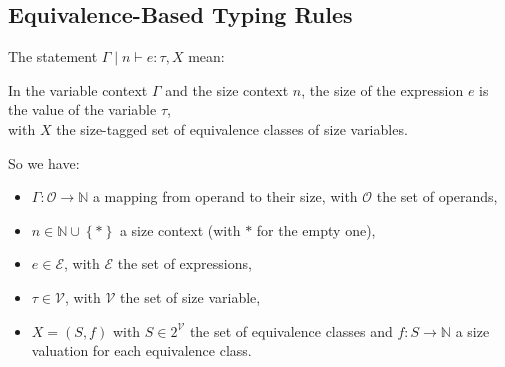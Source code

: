 \documentclass{article}
\begin{document}
\subsection*{Equivalence-Based Typing Rules}

The statement $\Gamma \mid n \vdash e: \tau, X$ mean:
\begin{center}
  In the variable context $\Gamma$ and the size context $n$, the size of the expression $e$ is the value of the variable $\tau$,\\
  with $X$ the size-tagged set of equivalence classes of size
  variables.
\end{center}

So we have:
\begin{itemize}
  \item $\Gamma: \mathcal{O} \to \mathbb{N}$ a mapping from operand to
        their size, with $\mathcal{O}$ the set of operands,
  \item $n \in \mathbb{N} \cup \left\{\ast\right\}$ a size context (with
        $\ast$ for the empty one),
  \item $e \in \mathcal{E}$, with $\mathcal{E}$ the set of expressions,
  \item $\tau \in \mathcal{V}$, with $\mathcal{V}$ the set of size
        variable,
  \item $X = (S, f)$ with $S \in 2^{\mathcal{V}}$ the set of equivalence
        classes and $f: S \to \mathbb{N}$ a size valuation for each
        equivalence class.
\end{itemize}
\end{document}
